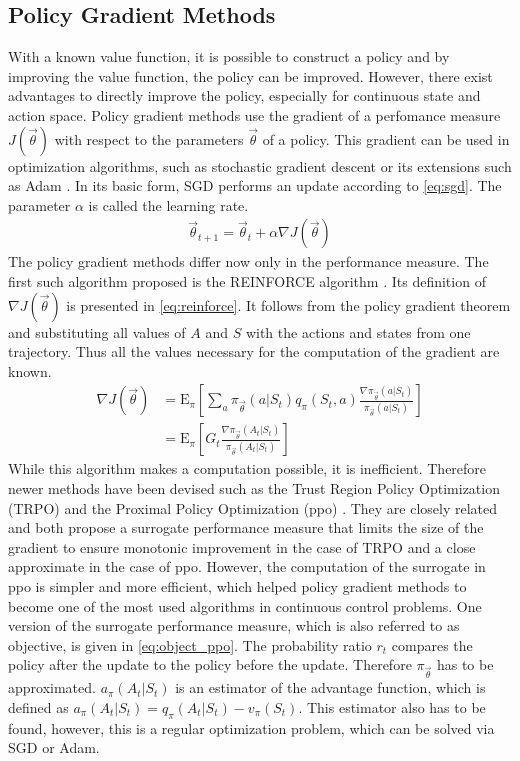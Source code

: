 \subsection{Policy Gradient Methods}
With a known value function, it is possible to construct a policy and by improving the value function, the policy can be improved. However, there exist advantages to directly improve the policy, especially for continuous state and action space. Policy gradient methods use the gradient of a perfomance measure $J(\vec{\theta})$ with respect to the parameters $\vec{\theta}$ of a policy. This gradient can be used in optimization algorithms, such as stochastic gradient descent \cite[p. 201]{sutton_reinforcement_2018} or its extensions such as Adam \cite{kingma_adam_2017}. In its basic form, SGD performs an update according to \ref{eq:sgd}. The parameter $\alpha$ is called the learning rate.
\begin{align}
	\vec{\theta}_{t+1} = \vec{\theta}_t + \alpha \nabla J(\vec{\theta}) \label{eq:sgd}
\end{align}
The policy gradient methods differ now only in the performance measure. The first such algorithm proposed is the REINFORCE algorithm \cite{williams_simple_1992}. Its definition of $\nabla J(\vec{\theta})$ is presented in \eqref{eq:reinforce}. It follows from the policy gradient theorem and substituting all values of $A$ and $S$ with the actions and states from one trajectory. Thus all the values necessary for the computation of the gradient are known. \cite[p.324-328]{sutton_reinforcement_2018}
\begin{align}
	\nabla J(\vec{\theta}) 
	&= \mathrm{E}_\pi \left[ \sum_{a} \pi_{\vec{\theta}} (a\vert S_t) q_\pi(S_t, a)
	\frac{\nabla \pi_{\vec{\theta}}(a\vert S_t)}{\pi_{\vec{\theta}}(a\vert S_t)} \right]\label{eq:reinforce} \\
	&= \mathrm{E}_\pi \left[G_t \frac{\nabla \pi_{\vec{\theta}}(A_t\vert S_t)}{\pi_{\vec{\theta}}(A_t\vert S_t)} \right] \label{eq:reinforce2}
\end{align}
While this algorithm makes a computation possible, it is inefficient. Therefore newer methods have been devised such as the Trust Region Policy Optimization (TRPO) \cite{schulman_trust_2017} and the Proximal Policy Optimization (ppo) \cite{schulman_proximal_2017}. They are closely related and both propose a surrogate performance measure that limits the size of the gradient to ensure monotonic improvement in the case of TRPO and a close approximate in the case of ppo. However, the computation of the surrogate in ppo is simpler and more efficient, which helped policy gradient methods to become one of the most used algorithms in continuous control problems. One version of the surrogate performance measure, which is also referred to as objective, is given in \eqref{eq:object_ppo}. The probability ratio $r_t$ compares the policy after the update to the policy before the update. Therefore $\pi_{\vec{\theta}}$ has to be approximated. $a_\pi(A_t \vert S_t)$ is an estimator of the advantage function, which is defined as $a_\pi(A_t \vert S_t) = q_\pi(A_t \vert S_t) - v_\pi(S_t)$. This estimator also has to be found, however, this is a regular optimization problem, which can be solved via SGD or Adam.
